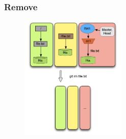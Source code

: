 \documentclass{beamer}
\begin{document}
\begin{frame}[fragile]
   \frametitle{Remove}
   \begin{figure}
      \centering
      \includegraphics[width=0.45\textwidth]{images/remove1.png}
   \end{figure}
\end{frame}
\end{document}
